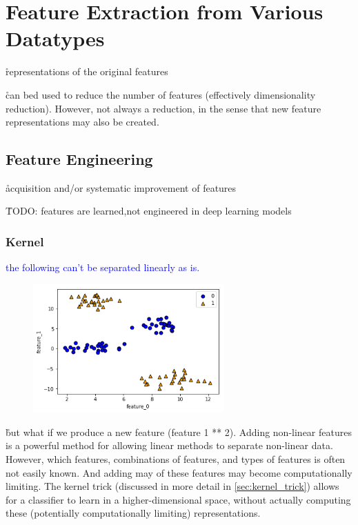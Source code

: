\section{Feature Extraction from Various Datatypes}


\r{representations of the original features}

\r{can bed used to reduce the number of features (effectively dimensionality reduction). However, not always a reduction, in the sense that new feature representations may also be created.}

\subsection{Feature Engineering}

\r{acquisition and/or systematic improvement of features}

\r{TODO: features are learned,not engineered in deep learning models}

\subsubsection{Kernel}

\textcolor{blue}{the following can't be separated linearly as is.}

\begin{figure}
\centering
\includegraphics[width=0.65\textwidth]{./sync_imgs/kernelized/2class4clust/2dimg.png}
\label{fig:kernelized_2class4clust_2dimg}
\end{figure}

\r{but what if we produce a new feature (feature 1 ** 2). Adding non-linear features is a powerful method for allowing linear methods to separate non-linear data. However, which features, combinations of features, and types of features is often not easily known. And adding may of these features may become computationally limiting. The {kernel trick} (discussed in more detail in \ref{sec:kernel_trick}) allows for a classifier to learn in a higher-dimensional space, without actually computing these (potentially computationally limiting) representations.}

